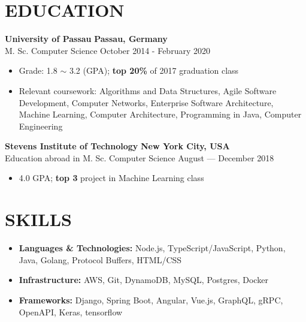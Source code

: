 \documentclass{memoir}
\begin{document}
\section*{EDUCATION}
\noindent \textbf{University of Passau}
\hfill
\textbf{Passau, Germany} \\
M. Sc. Computer Science
\hfill
October 2014 - February 2020
\begin{itemize}[noitemsep]
  \item Grade: 1.8 $\sim$ 3.2 (GPA); \textbf{top 20\%} of 2017 graduation class
  \item Relevant coursework: Algorithms and Data Structures, Agile Software Development, Computer Networks, Enterprise Software
Architecture,  Machine Learning, Computer Architecture, Programming in Java, Computer Engineering
\end{itemize}

\noindent \textbf{Stevens Institute of Technology}
\hfill
\textbf{New York City, USA} \\
Education abroad in M. Sc. Computer Science
\hfill
August — December 2018
\begin{itemize}[noitemsep]
  \item 4.0 GPA; \textbf{top 3} project in Machine Learning class
\end{itemize}

\section*{SKILLS}
\begin{itemize}[noitemsep]
  \item \textbf{Languages \& Technologies:} Node.js, TypeScript/JavaScript, Python, Java, Golang, Protocol Buffers, HTML/CSS
  \item \textbf{Infrastructure:} AWS, Git, DynamoDB, MySQL, Postgres, Docker
  \item \textbf{Frameworks:} Django, Spring Boot, Angular, Vue.js, GraphQL, gRPC, OpenAPI, Keras, tensorflow
\end{itemize}
\end{document}
